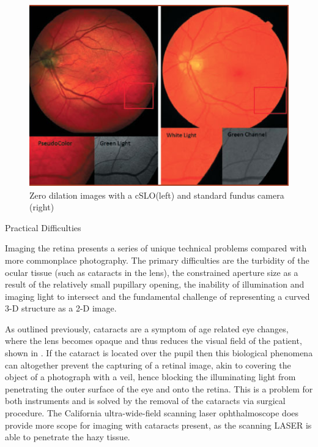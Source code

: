 \begin{figure}[htbp]
\centering
  \includegraphics{figures/zerodilation}
\caption{Zero dilation images with a cSLO(left) and standard fundus camera (right) }
\label{fig:zero}
     \end{figure}



Practical Difficulties 

Imaging the retina presents a series of unique technical problems compared with more commonplace photography. The primary difficulties are the turbidity of the ocular tissue (such as cataracts in the lens), the constrained aperture size as a result of the relatively small pupillary opening, the inability of illumination and imaging light to intersect and the fundamental challenge of representing a curved 3-D structure as a 2-D image. 

As outlined previously, cataracts are a symptom of age related eye changes, where the lens becomes opaque and thus reduces the visual field of the patient, shown in . If the cataract is located over the pupil then this biological phenomena can altogether prevent the capturing of a retinal image, akin to covering the object of a photograph with a veil, hence blocking the illuminating light from penetrating the outer surface of the eye and onto the retina. This is a problem for both instruments and is solved by the removal of the cataracts via surgical procedure. The California ultra-wide-field scanning laser ophthalmoscope does provide more scope for imaging with cataracts present, as the scanning LASER is able to penetrate the hazy tissue.

